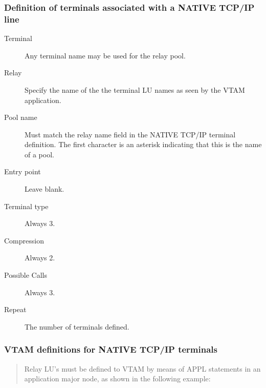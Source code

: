 \documentclass[letterpaper,10pt,english]{sphinxmanual}
\begin{document}
\subsubsection{Definition of terminals associated with a NATIVE TCP/IP line}
\label{\detokenize{connectivity_guide:id2}}\begin{description}
\item[{Terminal}] \leavevmode
Any terminal name may be used for the relay pool.

\item[{Relay}] \leavevmode
Specify the name of the the terminal LU names as seen by the VTAM
application.

\item[{Pool name}] \leavevmode
Must match the relay name field in the NATIVE TCP/IP terminal
definition. The first character is an asterisk indicating that this
is the name of a pool.

\item[{Entry point}] \leavevmode
Leave blank.

\item[{Terminal type}] \leavevmode
Always 3.

\item[{Compression}] \leavevmode
Always 2.

\item[{Possible Calls}] \leavevmode
Always 3.

\item[{Repeat}] \leavevmode
The number of terminals defined.

\end{description}


\subsubsection{VTAM definitions for NATIVE TCP/IP terminals}
\label{\detokenize{connectivity_guide:vtam-definitions-for-native-tcp-ip-terminals}}\begin{quote}

Relay LU’s must be defined to VTAM by means of APPL statements in an application major node, as shown in the following example:
\end{quote}
\end{document}

